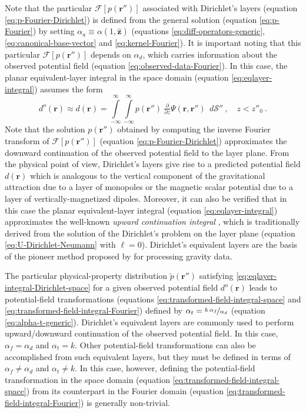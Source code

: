 Note that the particular $\mathcal{F} [ p(\mathbf{r}'') ]$ associated with Dirichlet's layers (equation \ref{eq:p-Fourier-Dirichlet}) 
is defined from the general solution (equation \ref{eq:p-Fourier}) by setting $\alpha_{a} \equiv \alpha(1, \hat{\mathbf{z}})$ 
(equations \ref{eq:diff-operators-generic}, \ref{eq:canonical-base-vector} and \ref{eq:kernel-Fourier}).
It is important noting that this particular $\mathcal{F} [ p(\mathbf{r}'') ]$ depends on $\alpha_{d}$, which 
carries information about the observed potential field (equation \ref{eq:observed-data-Fourier}).
In this case, the planar equivalent-layer integral in the space domain (equation \ref{eq:eqlayer-integral}) assumes the form
\begin{equation}
	d^{o}(\mathbf{r}) \approx
	d(\mathbf{r})
	= \int\limits_{-\infty}^{\infty}\int\limits_{-\infty}^{\infty}
	p(\mathbf{r}'') \: \tfrac{\partial}{\partial z} \Psi(\mathbf{r}, \mathbf{r}'') \:\: d\mathcal{S}''
	\: , \quad z < z''_{0} \: .
	\label{eq:eqlayer-integral-Dirichlet-space}
\end{equation}
Note that the solution $p(\mathbf{r}'')$ obtained by computing the inverse Fourier transform of 
$\mathcal{F} [ p(\mathbf{r}'') ]$ (equation \ref{eq:p-Fourier-Dirichlet}) approximates the
downward continuation of the observed potential field to the layer plane.
From the physical point of view, Dirichlet's layers give rise to a predicted potential field $d(\mathbf{r})$ which is analogous
to the vertical component of the gravitational attraction due to a layer of monopoles
or the magnetic scalar potential due to a layer of vertically-magnetized dipoles.
Moreover, it can also be verified that in this case the planar equivalent-layer integral 
(equation \ref{eq:eqlayer-integral}) approximates the well-known \textit{upward continuation integral} 
\citep[e.g.,][]{skeels1947, peters1949, henderson-zietz1949, dean1958, roy1962, bhattacharyya1967, henderson1970},
which is traditionally derived from the solution of the Dirichlet’s problem on the
layer plane (equation \ref{eq:U-Dirichlet-Neumann} with $\ell = 0$). 
Dirichlet's equivalent layers are the basis of the pioneer method proposed by \cite{dampney1969} for processing gravity data.

The particular physical-property distribution $\tilde{p}(\mathbf{r}'')$ satisfying \ref{eq:eqlayer-integral-Dirichlet-space}
for a given observed potential field $d^{o}(\mathbf{r})$ leads to potential-field transformations (equations 
\ref{eq:transformed-field-integral-space} and \ref{eq:transformed-field-integral-Fourier}) defined by 
$\alpha_{t} = \nicefrac{k \, \alpha_{f}}{\alpha_{d}}$ (equation \ref{eq:alpha-t-generic}).
Dirichlet's equivalent layers are commonly used to perform upward/downward continuation of the observed potential 
field. In this case, $\alpha_{f} = \alpha_{d}$ and $\alpha_{t} = k$. 
Other potential-field transformations can also be accomplished from such equivalent layers, but they must be 
defined in terms of $\alpha_{f} \ne \alpha_{d}$ and $\alpha_{t} \ne k$.
In this case, however, defining the potential-field transformation in the space domain (equation \ref{eq:transformed-field-integral-space})
from its counterpart in the Fourier domain (equation \ref{eq:transformed-field-integral-Fourier}) is generally 
non-trivial.


